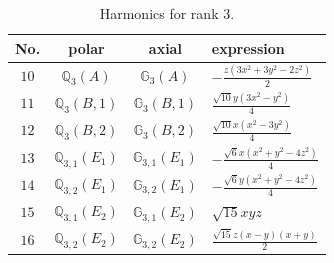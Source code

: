 \documentclass[fleqn,8pt,landscape]{jsarticle}
\begin{document}
\begin{table}[ht!]
\begin{center}
\caption{Harmonics for rank 3.}
\renewcommand{\arraystretch}{1.3}
\begin{tabular}{cccl} \hline \hline
No. & polar & axial & expression \\ \hline
$ 10 $ & $ \mathbb{Q}_{3}(A) $ & $ \mathbb{G}_{3}(A) $ & $ - \frac{z \left(3 x^{2} + 3 y^{2} - 2 z^{2}\right)}{2} $ \\
$ 11 $ & $ \mathbb{Q}_{3}(B,1) $ & $ \mathbb{G}_{3}(B,1) $ & $ \frac{\sqrt{10} y \left(3 x^{2} - y^{2}\right)}{4} $ \\
$ 12 $ & $ \mathbb{Q}_{3}(B,2) $ & $ \mathbb{G}_{3}(B,2) $ & $ \frac{\sqrt{10} x \left(x^{2} - 3 y^{2}\right)}{4} $ \\
$ 13 $ & $ \mathbb{Q}_{3,1}(E_{1}) $ & $ \mathbb{G}_{3,1}(E_{1}) $ & $ - \frac{\sqrt{6} x \left(x^{2} + y^{2} - 4 z^{2}\right)}{4} $ \\
$ 14 $ & $ \mathbb{Q}_{3,2}(E_{1}) $ & $ \mathbb{G}_{3,2}(E_{1}) $ & $ - \frac{\sqrt{6} y \left(x^{2} + y^{2} - 4 z^{2}\right)}{4} $ \\
$ 15 $ & $ \mathbb{Q}_{3,1}(E_{2}) $ & $ \mathbb{G}_{3,1}(E_{2}) $ & $ \sqrt{15} x y z $ \\
$ 16 $ & $ \mathbb{Q}_{3,2}(E_{2}) $ & $ \mathbb{G}_{3,2}(E_{2}) $ & $ \frac{\sqrt{15} z \left(x - y\right) \left(x + y\right)}{2} $ \\
 \hline \hline
\end{tabular}
\end{center}
\end{table}
\end{document}
